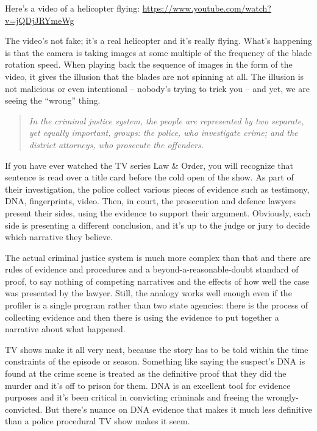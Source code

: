 




Here's a video of a helicopter flying: \url{https://www.youtube.com/watch?v=jQDjJRYmeWg} 

The video's not fake; it's a real helicopter and it's really flying. What's happening is that the camera is taking images at some multiple of the frequency of the blade rotation speed. When playing back the sequence of images in the form of the video, it gives the illusion that the blades are not spinning at all. The illusion is not malicious or even intentional -- nobody's trying to trick you -- and yet, we are seeing the ``wrong'' thing.

\vspace{-1em}
\begin{quote}
\textit{
In the criminal justice system, the people are represented by two separate, yet equally important, groups: the police, who investigate crime; and the district attorneys, who prosecute the offenders.
}
\end{quote}
\vspace{-1em}

If you have ever watched the TV series Law \& Order, you will recognize that sentence is read over a title card before the cold open of the show. As part of their investigation, the police collect various pieces of evidence such as testimony, DNA, fingerprints, video. Then, in court, the prosecution and defence lawyers present their sides, using the evidence to support their argument. Obviously, each side is presenting a different conclusion, and it's up to the judge or jury to decide which narrative they believe.

The actual criminal justice system is much more complex than that and there are rules of evidence and procedures and a beyond-a-reasonable-doubt standard of proof, to say nothing of competing narratives and the effects of how well the case was presented by the lawyer. Still, the analogy works well enough even if the profiler is a single program rather than two state agencies: there is the process of collecting evidence and then there is using the evidence to put together a narrative about what happened. 

TV shows make it all very neat, because the story has to be told within the time constraints of the episode or season. Something like saying the suspect's DNA is found at the crime scene is treated as the definitive proof that they did the murder and it's off to prison for them. DNA is an excellent tool for evidence purposes and it's been critical in convicting criminals and freeing the wrongly-convicted. But there's nuance on DNA evidence that makes it much less definitive than a police procedural TV show makes it seem.

